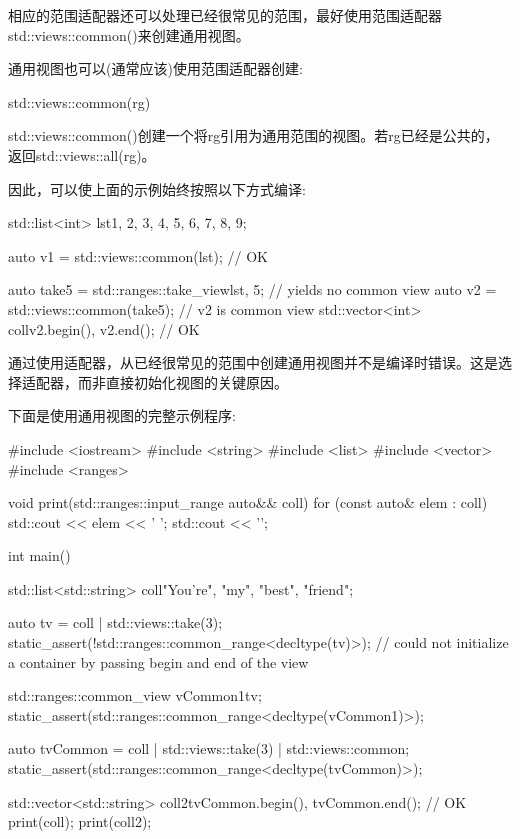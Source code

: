相应的范围适配器还可以处理已经很常见的范围，最好使用范围适配器std::views::common()来创建通用视图。


通用视图也可以(通常应该)使用范围适配器创建:

\begin{cpp}
std::views::common(rg)
\end{cpp}

std::views::common()创建一个将rg引用为通用范围的视图。若rg已经是公共的，返回std::views::all(rg)。

因此，可以使上面的示例始终按照以下方式编译:

\begin{cpp}
std::list<int> lst{1, 2, 3, 4, 5, 6, 7, 8, 9};

auto v1 = std::views::common(lst); // OK

auto take5 = std::ranges::take_view{lst, 5}; // yields no common view
auto v2 = std::views::common(take5); // v2 is common view
std::vector<int> coll{v2.begin(), v2.end()}; // OK
\end{cpp}

通过使用适配器，从已经很常见的范围中创建通用视图并不是编译时错误。这是选择适配器，而非直接初始化视图的关键原因。

下面是使用通用视图的完整示例程序:


\begin{cpp}
#include <iostream>
#include <string>
#include <list>
#include <vector>
#include <ranges>

void print(std::ranges::input_range auto&& coll)
{
	for (const auto& elem : coll) {
		std::cout << elem << ' ';
	}
	std::cout << '\n';
}

int main()
{
	std::list<std::string> coll{"You're", "my", "best", "friend"};
	
	auto tv = coll | std::views::take(3);
	static_assert(!std::ranges::common_range<decltype(tv)>);
	// could not initialize a container by passing begin and end of the view
	
	std::ranges::common_view vCommon1{tv};
	static_assert(std::ranges::common_range<decltype(vCommon1)>);
	
	auto tvCommon = coll | std::views::take(3) | std::views::common;
	static_assert(std::ranges::common_range<decltype(tvCommon)>);
	
	std::vector<std::string> coll2{tvCommon.begin(), tvCommon.end()}; // OK
	print(coll);
	print(coll2);
}
\end{cpp}

